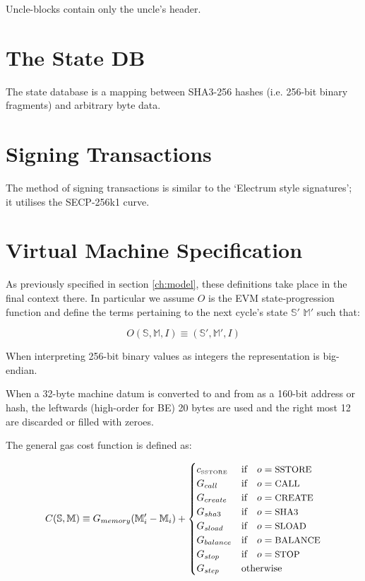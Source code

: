 \documentclass[9pt,oneside]{amsart}
\begin{document}
Uncle-blocks contain only the uncle's header.

\section{The State DB}\label{app:state}

The state database is a mapping between SHA3-256 hashes (i.e. 256-bit binary fragments) and arbitrary byte data.

\section{Signing Transactions}\label{app:signing}

The method of signing transactions is similar to the `Electrum style signatures'; it utilises the SECP-256k1 curve.

\section{Virtual Machine Specification}\label{app:vm}

As previously specified in section \ref{ch:model}, these definitions take place in the final context there. In particular we assume $O$ is the EVM state-progression function and define the terms pertaining to the next cycle's state $\mathbb{S}'$ $\mathbb{M}'$ such that:

\begin{equation}
O(\mathbb{S}, \mathbb{M}, I) \equiv (\mathbb{S}', \mathbb{M}', I)
\end{equation}

When interpreting 256-bit binary values as integers the representation is big-endian.

When a 32-byte machine datum is converted to and from as a 160-bit address or hash, the leftwards (high-order for BE) 20 bytes are used and the right most 12 are discarded or filled with zeroes.

The general gas cost function is defined as:

\begin{equation}
C(\mathbb{S}, \mathbb{M}) \equiv G_{memory}(\mathbb{M}'_i - \mathbb{M}_i) + \begin{cases}
c_\text{\tiny SSTORE} & \text{if} \quad o = \text{\small SSTORE} \\
G_{call} & \text{if} \quad o = \text{\small CALL}\\
G_{create} & \text{if} \quad o = \text{\small CREATE}\\
G_{sha3} & \text{if} \quad o = \text{\small SHA3}\\
G_{sload} & \text{if} \quad o = \text{\small SLOAD}\\
G_{balance} & \text{if} \quad o = \text{\small BALANCE}\\
G_{stop} & \text{if} \quad o = \text{\small STOP}\\
G_{step} & \text{otherwise}
\end{cases}
\end{equation}
\end{document}
